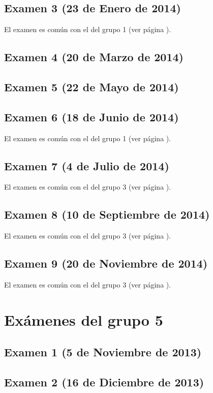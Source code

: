 \documentclass[a4paper,12pt,twoside]{book}
\begin{document}
\section{Examen 3 (23 de Enero de 2014)}
El examen es común con el del grupo 1 (ver página \pageref{examen_13_14_3_3}).
\section{Examen 4 (20 de Marzo de 2014)}
\section{Examen 5 (22 de Mayo de 2014)}
\section{Examen 6 (18 de Junio de 2014)}
El examen es común con el del grupo 1 (ver página \pageref{examen_13_14_3_6}).
\section{Examen 7 (4 de Julio de 2014)}
El examen es común con el del grupo 3 (ver página \pageref{examen_13_14_1_7}). 
\section{Examen 8 (10 de Septiembre de 2014)}
El examen es común con el del grupo 3 (ver página \pageref{examen_13_14_1_8}). 
\section{Examen 9 (20 de Noviembre de 2014)}
El examen es común con el del grupo 3 (ver página \pageref{examen_13_14_1_9}). 

\chapter{Exámenes del grupo 5}
\section{Examen 1 (5 de Noviembre de 2013)}
\section{Examen 2 (16 de Diciembre de 2013)}
\end{document}
